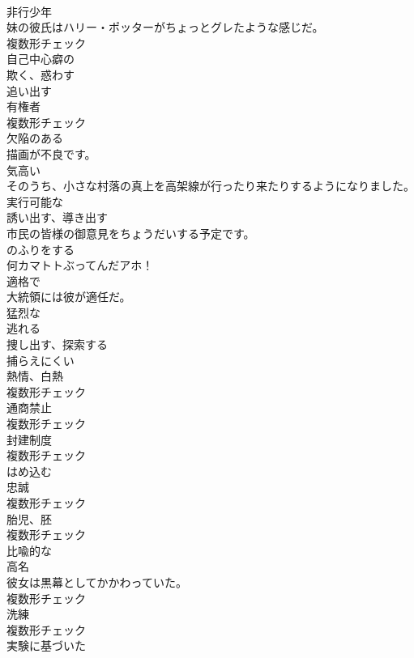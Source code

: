 \documentclass[8pt]{extreport}
\begin{document}
\begin{CJK}{UTF8}{min}
\\	[名詞]	非行少年	
\\	妹の彼氏はハリー・ポッターがちょっとグレたような感じだ。	
\\	複数形チェック
\\	[形容詞]	自己中心癖の	
\\	[動詞]	欺く、惑わす	
\\	[動詞]	追い出す	
\\	[名詞]	有権者	
\\	複数形チェック
\\	[形容詞]	欠陥のある	
\\	描画が不良です。	
\\	[形容詞]	気高い	
\\	そのうち、小さな村落の真上を高架線が行ったり来たりするようになりました。	
\\	[形容詞]	実行可能な	
\\	[動詞]	誘い出す、導き出す	
\\	市民の皆様の御意見をちょうだいする予定です。	
\\	[動詞]	のふりをする	
\\	何カマトトぶってんだアホ！	
\\	[形容詞]	適格で	
\\	大統領には彼が適任だ。	
\\	[形容詞]	猛烈な	
\\	[動詞]	逃れる	
\\	[動詞]	捜し出す、探索する	
\\	[形容詞]	捕らえにくい	
\\	[名詞]	熱情、白熱	
\\	複数形チェック
\\	[名詞]	通商禁止	
\\	複数形チェック
\\	[名詞]	封建制度	
\\	複数形チェック
\\	[動詞]	はめ込む	
\\	[名詞]	忠誠	
\\	複数形チェック
\\	[名詞]	胎児、胚	
\\	複数形チェック
\\	[形容詞]	比喩的な	
\\	[名詞]	高名	
\\	彼女は黒幕としてかかわっていた。	
\\	複数形チェック
\\	[名詞]	洗練	
\\	複数形チェック
\\	[形容詞]	実験に基づいた	

\end{CJK}
\end{document}
